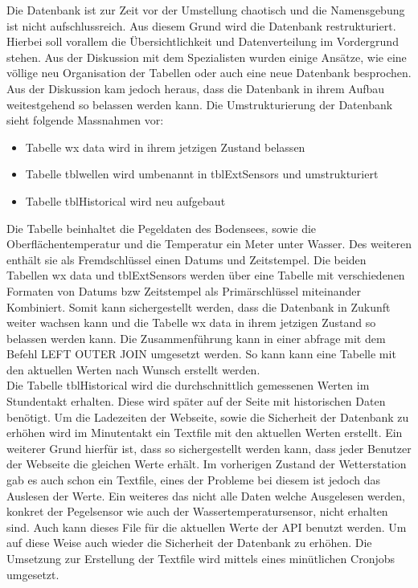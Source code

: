 Die Datenbank ist zur Zeit vor der Umstellung chaotisch und die Namensgebung ist nicht aufschlussreich. Aus diesem Grund wird die Datenbank restrukturiert. Hierbei soll vorallem die Übersichtlichkeit und Datenverteilung im Vordergrund stehen. Aus der Diskussion mit dem Spezialisten wurden einige Ansätze, wie eine völlige neu Organisation der Tabellen oder auch eine neue Datenbank besprochen. Aus der Diskussion kam jedoch heraus, dass die Datenbank in ihrem Aufbau weitestgehend so belassen werden kann. Die Umstrukturierung der Datenbank sieht folgende Massnahmen vor:
\begin{itemize}
\item Tabelle wx data wird in ihrem jetzigen Zustand belassen
\item Tabelle tblwellen wird umbenannt in tblExtSensors und umstrukturiert
\item Tabelle tblHistorical wird neu aufgebaut
\end{itemize}
Die Tabelle  beinhaltet die Pegeldaten des Bodensees, sowie die Oberflächentemperatur und die Temperatur ein Meter unter Wasser. Des weiteren enthält sie als Fremdschlüssel einen Datums und Zeitstempel. Die beiden Tabellen wx data und tblExtSensors werden über eine Tabelle mit verschiedenen Formaten von Datums bzw Zeitstempel als Primärschlüssel miteinander Kombiniert. Somit kann sichergestellt werden, dass die Datenbank in Zukunft weiter wachsen kann und die Tabelle wx data in ihrem jetzigen Zustand so belassen werden kann. Die Zusammenführung kann in einer abfrage mit dem Befehl LEFT OUTER JOIN umgesetzt werden. So kann kann eine Tabelle mit den aktuellen Werten nach Wunsch erstellt werden.\\
Die Tabelle tblHistorical wird die durchschnittlich gemessenen Werten im Stundentakt erhalten. Diese wird später auf der Seite mit historischen Daten benötigt. Um die Ladezeiten der Webseite, sowie die Sicherheit der Datenbank zu erhöhen wird im Minutentakt ein Textfile mit den aktuellen Werten erstellt. Ein weiterer Grund hierfür ist, dass so sichergestellt werden kann, dass jeder Benutzer der Webseite die gleichen Werte erhält. Im vorherigen Zustand der Wetterstation gab es auch schon ein Textfile, eines der Probleme bei diesem ist jedoch das Auslesen der Werte. Ein weiteres das nicht alle Daten welche Ausgelesen werden, konkret der Pegelsensor wie auch der Wassertemperatursensor, nicht erhalten sind. Auch kann dieses File für die aktuellen Werte der API benutzt werden. Um auf diese Weise auch wieder die Sicherheit der Datenbank zu erhöhen. Die Umsetzung zur Erstellung der Textfile wird mittels eines minütlichen Cronjobs umgesetzt. 

